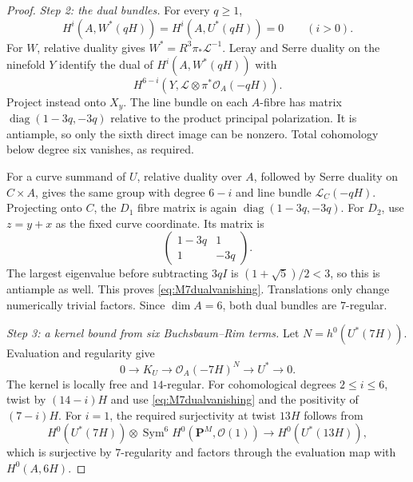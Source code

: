 \documentclass[11pt,a4paper]{article}
\theoremstyle{definition}\newtheorem{definition}[theorem]{Definition}
\theoremstyle{remark}\newtheorem{remark}[theorem]{Remark}
\newcommand{\cO}{\mathcal O}\newcommand{\CH}{\operatorname{CH}}\newcommand{\cl}{\operatorname{cl}}
\begin{document}
\begin{proof}
\emph{Step 2: the dual bundles.}
For every $q\ge1$,
\begin{equation}\label{eq:M7dualvanishing}
 H^i(A,W^*(qH))=H^i(A,U^*(qH))=0\qquad(i>0).
\end{equation}
For $W$, relative duality gives $W^*=R^3\pi_*\mathcal L^{-1}$.
Leray and Serre duality on the ninefold $Y$ identify the dual of
$H^i(A,W^*(qH))$ with
\[
 H^{6-i}(Y,\mathcal L\otimes\pi^*\cO_A(-qH)).
\]
Project instead onto $X_y$. The line bundle on each $A$-fibre has matrix
$\operatorname{diag}(1-3q,-3q)$ relative to the product principal
polarization. It is antiample, so only the sixth direct image can
be nonzero. Total cohomology below degree six vanishes, as required.

For a curve summand of $U$, relative duality over $A$, followed by Serre
duality on $C\times A$, gives the same group with degree $6-i$ and
line bundle $\mathcal L_C(-qH)$. Projecting onto $C$, the $D_1$ fibre
matrix is again $\operatorname{diag}(1-3q,-3q)$. For $D_2$, use
$z=y+x$ as the fixed curve coordinate. Its matrix is
\[
 \begin{pmatrix}1-3q&1\\1&-3q\end{pmatrix}.
\]
The largest eigenvalue before subtracting $3qI$ is
$(1+\sqrt5)/2<3$, so this is antiample as well. This proves
\eqref{eq:M7dualvanishing}. Translations only change numerically trivial
factors. Since $\dim A=6$, both dual bundles are $7$-regular.

\emph{Step 3: a kernel bound from six Buchsbaum--Rim terms.}
Let $N=h^0(U^*(7H))$. Evaluation and regularity give
\[
 0\longrightarrow K_U\longrightarrow\cO_A(-7H)^N
                  \longrightarrow U^*\longrightarrow0.
\]
The kernel is locally free and $14$-regular. For cohomological degrees
$2\le i\le6$, twist by $(14-i)H$ and use
\eqref{eq:M7dualvanishing} and the positivity of $(7-i)H$.
For $i=1$, the required surjectivity at twist $13H$ follows from
\[
 H^0(U^*(7H))\otimes
       \operatorname{Sym}^6H^0(\mathbf P^M,\cO(1))
       \longrightarrow H^0(U^*(13H)),
\]
which is surjective by $7$-regularity and factors through the evaluation
map with $H^0(A,6H)$.


\end{proof}
\end{document}
